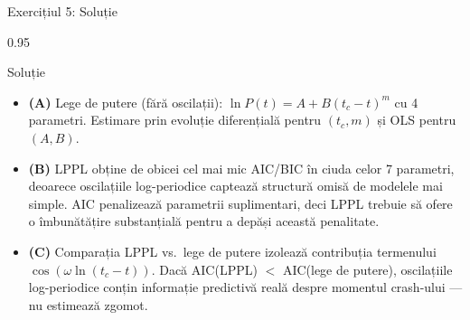 \documentclass[9pt, aspectratio=169, t]{beamer}
\begin{document}
\begin{frame}{Exercițiul 5: Soluție}
    \begin{cminipage}{0.95\textwidth}
    \begin{exampleblock}{Soluție}
        {\small
        \begin{itemize}\setlength{\itemsep}{3pt}
            \item \textcolor{MainBlue}{\textbf{(A)}} Lege de putere (fără oscilații): $\ln P(t) = A + B(t_c - t)^m$ cu 4 parametri. Estimare prin evoluție diferențială pentru $(t_c, m)$ și OLS pentru $(A, B)$.
            \item \textcolor{MainBlue}{\textbf{(B)}} LPPL obține de obicei cel mai mic AIC/BIC în ciuda celor 7 parametri, deoarece oscilațiile log-periodice captează structură omisă de modelele mai simple. AIC penalizează parametrii suplimentari, deci LPPL trebuie să ofere o îmbunătățire substanțială pentru a depăși această penalitate.
            \item \textcolor{MainBlue}{\textbf{(C)}} Comparația LPPL vs.\ lege de putere izolează contribuția termenului $\cos(\omega \ln(t_c - t))$. Dacă AIC(LPPL) $<$ AIC(lege de putere), oscilațiile log-periodice conțin informație predictivă reală despre momentul crash-ului --- nu estimează zgomot.
        \end{itemize}
        }
    \end{exampleblock}
    \end{cminipage}
\end{frame}
\end{document}
